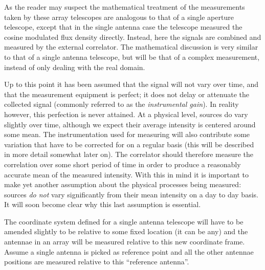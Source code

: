 \documentclass[a4paper,10pt]{report}
\begin{document}
As the reader may suspect the mathematical treatment of the measurements taken by these array telescopes are analogous
to that of a single aperture telescope, except that in the single antenna case the telescope measured the cosine modulated
flux density directly. Instead, here the signals are combined and measured by the external correlator. The mathematical 
discussion is very similar to that of a single antenna telescope, but will be that of a complex measurement, 
instead of only dealing with the real domain.

Up to this point it has been assumed that the signal will not vary over time, and that the measurement equipment is perfect; it 
does not delay or attenuate the collected signal (commonly referred to as the \textit{instrumental gain}). In reality however, 
this perfection is never attained. At a physical level, sources do vary slightly over time, although we expect their average 
intensity is centered around some mean. The instrumentation used for measuring will also contribute some variation that have to 
be corrected for on a regular basis (this will be described in more detail somewhat later on). The correlator should therefore 
measure the correlation over some short period of time in order to produce a reasonably accurate mean of the measured intensity. 
With this in mind it is important to make yet another assumption about the physical processes being measured: sources \textit{do not} 
vary significantly from their mean intensity on a day to day basis. It will soon become clear why this last assumption is essential.

The coordinate system defined for a single antenna telescope will have to be amended slightly to be relative to some fixed
location (it can be any) and the antennae in an array will be measured relative to this new coordinate frame. Assume
a single antenna is picked as reference point and all the other antennae positions are measured relative to this ``reference 
antenna''. 
\end{document}
